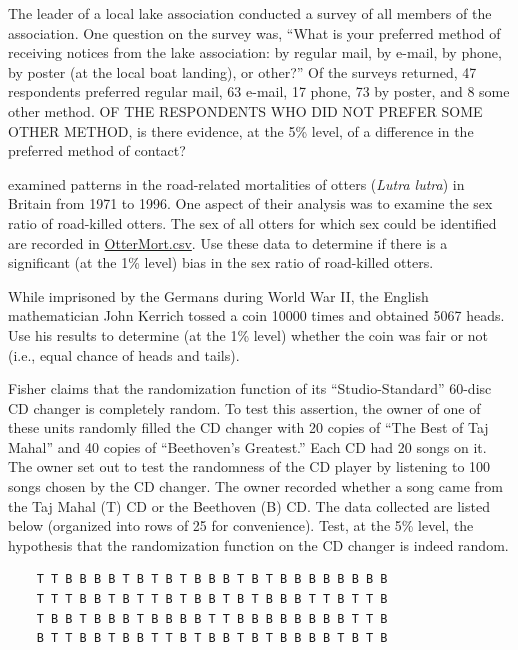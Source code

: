 \documentclass[10pt,openany]{book}\usepackage[]{graphicx}\usepackage[]{color}
\begin{document}
\begin{exsection}
  \item \label{revex:ChiGOFPref1} \rhw{} The leader of a local lake association conducted a survey of all members of the association.  One question on the survey was, ``What is your preferred method of receiving notices from the lake association: by regular mail, by e-mail, by phone, by poster (at the local boat landing), or other?''  Of the surveys returned, 47 respondents preferred regular mail, 63 e-mail, 17 phone, 73 by poster, and 8 some other method.  OF THE RESPONDENTS WHO DID NOT PREFER SOME OTHER METHOD, is there evidence, at the 5\% level, of a difference in the preferred method of contact? 

  \item \label{revex:ChiGOFOtterMortality} \rhw{} \cite{Philcoxetal1999} examined patterns in the road-related mortalities of otters (\emph{Lutra lutra}) in Britain from 1971 to 1996.  One aspect of their analysis was to examine the sex ratio of road-killed otters.  The sex of all otters for which sex could be identified are recorded in \href{https://raw.githubusercontent.com/droglenc/NCData/master/OtterMort.csv}{OtterMort.csv}.  Use these data to determine if there is a significant (at the 1\% level) bias in the sex ratio of road-killed otters. 

  \item \label{revex:ChiGOFCoin} \rhw{} While imprisoned by the Germans during World War II, the English mathematician John Kerrich tossed a coin 10000 times and obtained 5067 heads.  Use his results to determine (at the 1\% level) whether the coin was fair or not (i.e., equal chance of heads and tails). 

  \item \label{revex:ChiGOFCD} \rhw{} Fisher claims that the randomization function of its ``Studio-Standard'' 60-disc CD changer is completely random.  To test this assertion, the owner of one of these units randomly filled the CD changer with 20 copies of ``The Best of Taj Mahal'' and 40 copies of ``Beethoven's Greatest.''  Each CD had 20 songs on it.  The owner set out to test the randomness of the CD player by listening to 100 songs chosen by the CD changer.  The owner recorded whether a song came from the Taj Mahal (T) CD or the Beethoven (B) CD.  The data collected are listed below (organized into rows of 25 for convenience).  Test, at the 5\% level, the hypothesis that the randomization function on the CD changer is indeed random. 
    \begin{Verbatim}
    T T B B B B T B T B T B B B T B T B B B B B B B B
    T T T B B T B T T B T B B T B T B B B T T B T T B
    T B B T B B B T B B B B T T B B B B B B B B T T B
    B T T B B T B B T T B T B B T B T B B B B T B T B
    \end{Verbatim}


\end{exsection}
\end{document}
